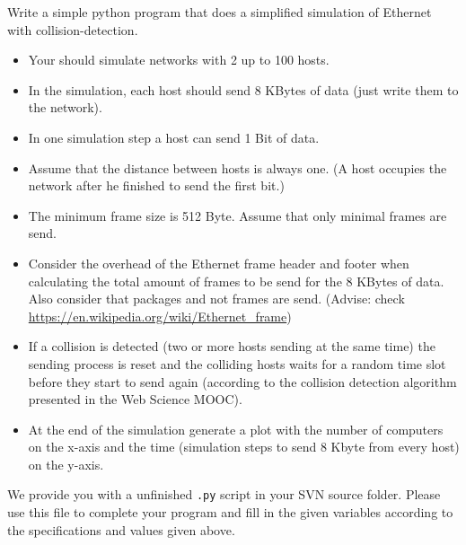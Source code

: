 \documentclass{WeSTassignment}
\begin{document}
Write a simple python program that does a simplified simulation of Ethernet with
collision-detection.

\begin{itemize}
  \item Your should simulate networks with 2 up to 100 hosts.
  \item In the simulation, each host should send 8 KBytes of data (just write
    them to the network).
  \item In one simulation step a host can send 1 Bit of data.
  \item Assume that the distance between hosts is always one. (A host occupies
    the network after he finished to send the first bit.)
  \item The minimum frame size is 512 Byte. Assume that only minimal frames are
    send.
  \item Consider the overhead of the Ethernet frame header and footer when
    calculating the total amount of frames to be send for the 8 KBytes of data.
    Also consider that packages and not frames are send. (Advise: check
    \url{https://en.wikipedia.org/wiki/Ethernet_frame})
  \item If a collision is detected (two or more hosts sending at the same time)
    the sending process is reset and the colliding hosts waits for a random time
    slot before they start to send again (according to the collision detection
    algorithm presented in the Web Science MOOC).
  \item At the end of the simulation generate a plot with the number of
    computers on the x-axis and the time (simulation steps to send 8 Kbyte from
    every host) on the y-axis.
\end{itemize}

We provide you with a unfinished \texttt{.py} script in your SVN source folder.
Please use this file to complete your program and fill in the given variables
according to the specifications and values given above.

\makefooter
\end{document}
